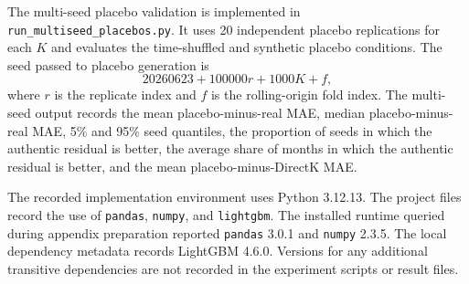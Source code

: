 The multi-seed placebo validation is implemented in \texttt{run\_multiseed\_placebos.py}. It uses 20 independent placebo replications for each \(K\) and evaluates the time-shuffled and synthetic placebo conditions. The seed passed to placebo generation is
\[
20260623 + 100000r + 1000K + f,
\]
where \(r\) is the replicate index and \(f\) is the rolling-origin fold index. The multi-seed output records the mean placebo-minus-real MAE, median placebo-minus-real MAE, 5\% and 95\% seed quantiles, the proportion of seeds in which the authentic residual is better, the average share of months in which the authentic residual is better, and the mean placebo-minus-DirectK MAE.

The recorded implementation environment uses Python 3.12.13. The project files record the use of \texttt{pandas}, \texttt{numpy}, and \texttt{lightgbm}. The installed runtime queried during appendix preparation reported \texttt{pandas} 3.0.1 and \texttt{numpy} 2.3.5. The local dependency metadata records LightGBM 4.6.0. Versions for any additional transitive dependencies are not recorded in the experiment scripts or result files.
